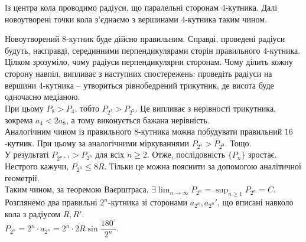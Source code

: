 \documentclass[a4paper, 10pt]{article}
\theoremstyle{theoremdd}
\theoremstyle{theoremdd}
\theoremstyle{theoremdd}
\theoremstyle{theoremdd}
\theoremstyle{theoremdd}
\theoremstyle{theoremdd}
\theoremstyle{theoremdd}
\theoremstyle{theoremdd}
\theoremstyle{theoremdd}
\begin{document}
Із центра кола проводимо радіуси, що паралельні сторонам $4$-кутника. Далі новоутворені точки кола з'єднаємо з вершинами $4$-кутника таким чином.
\begin{figure}[H]
\centering
{}
\end{figure} 
Новоутворений $8$-кутник буде дійсно правильним. Справді, проведені радіуси будуть, насправді, серединними перпендикулярами сторін правильного $4$-кутника. Цілком зрозуміло, чому радіуси перпендикулярни сторонам. Чому ділить кожну сторону навпіл, випливає з наступних спостережень: проведіть радіуси на вершини $4$-кутника -- утвориться рівнобедрений трикутник, де висота буде одночасно медіаною.\\
При цьому $P_8 > P_4$, тобто $P_{2^3} > P_{2^2}$. Це випливає з нерівності трикутника, зокрема $a_4 < 2a_8$, а тому виконується бажана нерівність.
\bigskip \\
Аналогічним чином із правильного $8$-кутника можна побудувати правильний $16$-кутник. При цьому за аналогічними міркуваннями $P_{2^4} > P_{2^3}$. Тощо.\\
У результаті $P_{2^{n+1}} > P_{2^n}$ для всіх $n \geq 2$. Отже, послідовність $\{P_n\}$ зростає.
\bigskip \\
Нестрого кажучи, $P_{2^{n}} \leq 8R$. Тільки це можна пояснити за допомогою аналітичної геометрії.\\
Таким чином, за теоремою Ваєрштраса, $\exists \displaystyle\lim_{n \to \infty} P_{2^n} = \sup_{n \geq 1} P_{2^n} = C$.
\bigskip \\
Розглянемо два правильні $2^n$-кутника зі сторонами $a_{2^n}, a_{2^n}'$, що вписані навколо кола з радіусом $R,R'$.\\
$P_{2^n} = 2^n \cdot a_{2^n} = 2^n \cdot 2R \sin \dfrac{180^\circ}{2^n}$.\\
\end{document}
